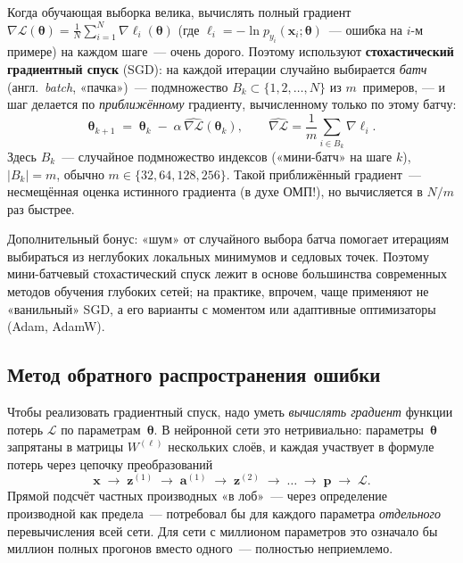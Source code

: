Когда обучающая выборка велика, вычислять полный градиент
$\nabla\mathcal L(\boldsymbol\theta)=\frac{1}{N}\sum_{i=1}^{N}\nabla\ell_i(\boldsymbol\theta)$
(где $\ell_i=-\ln p_{y_i}(\mathbf x_i;\boldsymbol\theta)$~--- ошибка на
$i$-м примере) на каждом шаге~--- очень дорого. Поэтому используют
\textbf{стохастический градиентный спуск} (SGD): на каждой итерации
случайно выбирается \emph{батч} (англ.\ \emph{batch}, «пачка»)~---
подмножество $B_k\subset\{1,2,\dots,N\}$ из $m$~примеров, --- и шаг
делается по \emph{приближённому} градиенту, вычисленному только по
этому батчу:
\begin{equation}\label{eq:sgd}
\boldsymbol\theta_{k+1}\;=\;\boldsymbol\theta_k\;-\;\alpha\,\widehat{\nabla\mathcal L}(\boldsymbol\theta_k),
\qquad
\widehat{\nabla\mathcal L}=\frac{1}{m}\sum_{i\in B_k}\nabla\ell_i.
\end{equation}
Здесь $B_k$~--- случайное подмножество индексов («мини-батч» на шаге
$k$), $|B_k|=m$, обычно $m\in\{32,64,128,256\}$.
Такой приближённый градиент~--- несмещённая оценка истинного градиента
(в духе ОМП!), но вычисляется в $N/m$ раз быстрее.

Дополнительный бонус: «шум» от случайного выбора батча помогает
итерациям выбираться из неглубоких локальных минимумов и седловых
точек. Поэтому мини-батчевый стохастический спуск лежит в основе большинства
современных методов обучения глубоких сетей; на практике, впрочем, чаще
применяют не «ванильный» SGD, а его варианты с моментом или адаптивные
оптимизаторы (Adam, AdamW).

\subsection{Метод обратного распространения ошибки}
\label{ssec:backprop}

Чтобы реализовать градиентный спуск, надо уметь \emph{вычислять
градиент} функции потерь $\mathcal L$ по параметрам~$\boldsymbol\theta$.
В нейронной сети это нетривиально: параметры~$\boldsymbol\theta$
запрятаны в матрицы $W^{(\ell)}$ нескольких слоёв, и каждая участвует
в формуле потерь через цепочку преобразований
\[
\mathbf x\;\to\;\mathbf z^{(1)}\;\to\;\mathbf a^{(1)}\;\to\;\mathbf z^{(2)}\;\to\;\dots\;\to\;\mathbf p\;\to\;\mathcal L.
\]
Прямой подсчёт частных производных «в лоб»~--- через определение
производной как предела~--- потребовал бы для каждого параметра
\emph{отдельного} перевычисления всей сети. Для сети с миллионом
параметров это означало бы миллион полных прогонов вместо одного~---
полностью неприемлемо.

